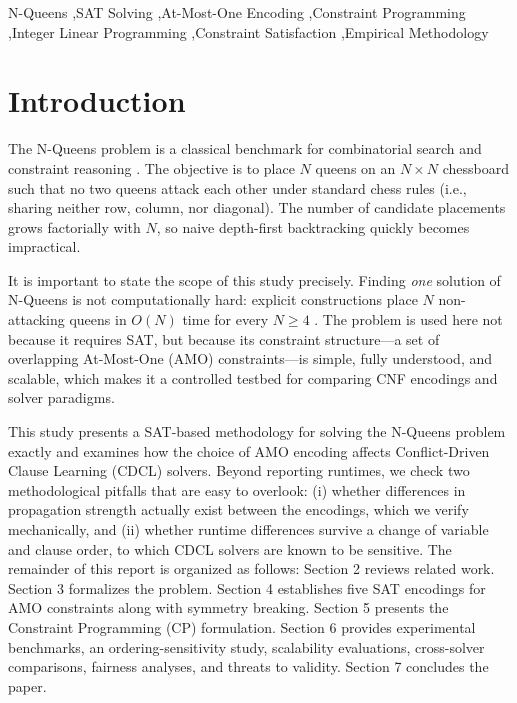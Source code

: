\documentclass[a4paper,fleqn]{cas-sc}
\begin{document}
\begin{keywords}
N-Queens \sep SAT Solving \sep At-Most-One Encoding \sep Constraint Programming \sep Integer Linear Programming \sep Constraint Satisfaction \sep Empirical Methodology
\end{keywords}

\section{Introduction}
The N-Queens problem is a classical benchmark for combinatorial search and constraint reasoning \cite{bell2009survey}. The objective is to place $N$ queens on an $N \times N$ chessboard such that no two queens attack each other under standard chess rules (i.e., sharing neither row, column, nor diagonal). The number of candidate placements grows factorially with $N$, so naive depth-first backtracking quickly becomes impractical.

It is important to state the scope of this study precisely. Finding \emph{one} solution of N-Queens is not computationally hard: explicit constructions place $N$ non-attacking queens in $O(N)$ time for every $N \geq 4$ \cite{bell2009survey}. The problem is used here not because it requires SAT, but because its constraint structure---a set of overlapping At-Most-One (AMO) constraints---is simple, fully understood, and scalable, which makes it a controlled testbed for comparing CNF encodings and solver paradigms.

This study presents a SAT-based methodology for solving the N-Queens problem exactly and examines how the choice of AMO encoding affects Conflict-Driven Clause Learning (CDCL) solvers. Beyond reporting runtimes, we check two methodological pitfalls that are easy to overlook: (i) whether differences in propagation strength actually exist between the encodings, which we verify mechanically, and (ii) whether runtime differences survive a change of variable and clause order, to which CDCL solvers are known to be sensitive. The remainder of this report is organized as follows: Section 2 reviews related work. Section 3 formalizes the problem. Section 4 establishes five SAT encodings for AMO constraints along with symmetry breaking. Section 5 presents the Constraint Programming (CP) formulation. Section 6 provides experimental benchmarks, an ordering-sensitivity study, scalability evaluations, cross-solver comparisons, fairness analyses, and threats to validity. Section 7 concludes the paper.
\end{document}
